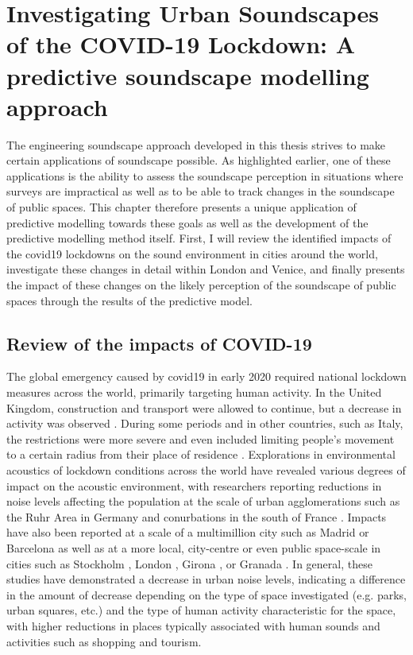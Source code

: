 \chapter{Investigating Urban Soundscapes of the COVID-19 Lockdown: A predictive soundscape modelling approach}
\label{ch:lockdown}

The engineering soundscape approach developed in this thesis strives to make certain applications of soundscape possible. As highlighted earlier, one of these applications is the ability to assess the soundscape perception in situations where surveys are impractical as well as to be able to track changes in the soundscape of public spaces. This chapter therefore presents a unique application of predictive modelling towards these goals as well as the development of the predictive modelling method itself. First, I will review the identified impacts of the \gls{covid19} lockdowns on the sound environment in cities around the world, investigate these changes in detail within London and Venice, and finally presents the impact of these changes on the likely perception of the soundscape of public spaces through the results of the predictive model. 


\section{Review of the impacts of COVID-19}
 \label{sec:covidReview}
 The global emergency caused by \gls{covid19} in early 2020 required national lockdown measures across the world, primarily targeting human activity. In the United Kingdom, construction and transport were allowed to continue, but a decrease in activity was observed \citep{Hadjidemetriou2020impact}. During some periods and in other countries, such as Italy, the restrictions were more severe and even included limiting people's movement to a certain radius from their place of residence \citep{Ren2020Pandemic}. Explorations in environmental acoustics of lockdown conditions across the world have revealed various degrees of impact on the acoustic environment, with researchers reporting reductions in noise levels affecting the population at the scale of urban agglomerations such as the Ruhr Area in Germany \citep{Hornberg2021Impact} and conurbations in the south of France \citep{Munoz2020Lockdown}. Impacts have also been reported at a scale of a multimillion city such as Madrid \citep{Asensio2020Changes} or Barcelona \citep{BonetSola2021Soundscape} as well as at a more local, city-centre or even public space-scale in cities such as Stockholm \citep{Rumpler2021Noise}, London \citep{Aletta2020Assessing}, Girona \citep{AlsinaPages2021Changes}, or Granada \citep{VidaManzano2021sound}. In general, these studies have demonstrated a decrease in urban noise levels, indicating a difference in the amount of decrease depending on the type of space investigated (e.g. parks, urban squares, etc.) and the type of human activity characteristic for the space, with higher reductions in places typically associated with human sounds and activities such as shopping and tourism.


